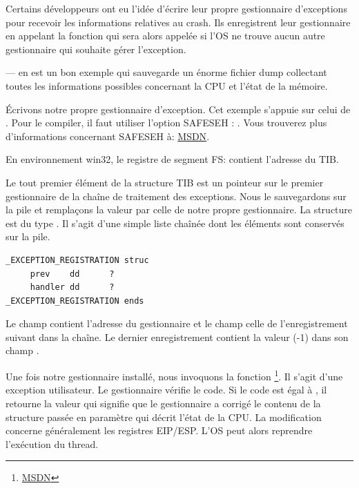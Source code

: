 Certains développeurs ont eu l'idée d'écrire leur propre gestionnaire d'exceptions pour recevoir
les informations relatives au crash.
Ils enregistrent leur gestionnaire en appelant la fonction  qui
sera alors appelée si l'\ac{OS} ne trouve aucun autre gestionnaire qui souhaite gérer l'exception.

\myindex{\oracle}
\oracle--- en est un bon exemple qui sauvegarde un énorme fichier dump collectant toutes les
informations possibles concernant la \ac{CPU} et l'état de la mémoire.

Écrivons notre propre gestionnaire d'exception. Cet exemple s'appuie sur celui de \PietrekSEH.
Pour le compiler, il faut utiliser l'option SAFESEH : .
Vous trouverez plus d'informations concernant SAFESEH à: \href{http://msdn.microsoft.com/en-us/library/9a89h429.aspx}{MSDN}.



En environnement win32, le registre de segment FS: contient l'adresse du \ac{TIB}.

Le tout premier élément de la structure \ac{TIB} est un pointeur sur le premier gestionnaire de la
chaîne de traitement des exceptions.
Nous le sauvegardons sur la pile et remplaçons la valeur par celle de notre propre gestionnaire.
La structure est du type . Il s'agit d'une simple liste chaînée dont
les éléments sont conservés sur la pile.

\begin{lstlisting}[caption=MSVC/VC/crt/src/exsup.inc,style=customasmx86]
_EXCEPTION_REGISTRATION struc
     prev    dd      ?
     handler dd      ?
_EXCEPTION_REGISTRATION ends
\end{lstlisting}

Le champ  contient l'adresse du gestionnaire et le champ  celle de
l'enregistrement suivant dans la chaîne.
Le dernier enregistrement contient la valeur  (-1) dans son champ .



Une fois notre gestionnaire installé, nous invoquons la fonction 
\footnote{\href{http://msdn.microsoft.com/en-us/library/windows/desktop/ms680552(v=vs.85).aspx}{MSDN}}.
Il s'agit d'une exception utilisateur.
Le gestionnaire vérifie le code.
Si le code est égal à , il retourne la valeur  qui
signifie que le gestionnaire a corrigé le contenu de la structure passée en paramètre qui décrit
l'état de la CPU. La modification concerne généralement les registres EIP/ESP. L'\ac{OS} peut alors
reprendre l'exécution du thread.

